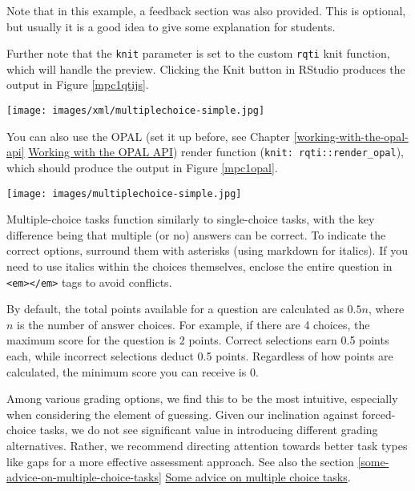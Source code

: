 \documentclass[twoside]{tufte-book}
\begin{document}
Note that in this example, a feedback section was also provided. This is optional, but usually it is a good idea to give some explanation for students.

Further note that the \texttt{knit} parameter is set to the custom \texttt{rqti} knit function, which will handle the preview. Clicking the Knit button in RStudio produces the output in Figure \ref{mpc1qtijs}.

\begin{figure*}
\centering
\texttt{[image: images/xml/multiplechoice-simple.jpg]}
\caption{\label{mpc1qtijs}Multiple choice task rendered in qtijs}
\end{figure*}

You can also use the OPAL (set it up before, see Chapter \ref{working-with-the-opal-api} \href{api_opal.html}{Working with the OPAL API}) render function (\texttt{knit:\ rqti::render\_opal}), which should produce the output in Figure \ref{mpc1opal}.

\begin{figure*}
\centering
\texttt{[image: images/multiplechoice-simple.jpg]}
\caption{\label{mpc1opal}Multiple choice task rendered in OPAL}
\end{figure*}

Multiple-choice tasks function similarly to single-choice tasks, with the key difference being that multiple (or no) answers can be correct. To indicate the correct options, surround them with asterisks (using markdown for italics). If you need to use italics within the choices themselves, enclose the entire question in \texttt{\textless{}em\textgreater{}\textless{}/em\textgreater{}} tags to avoid conflicts.

By default, the total points available for a question are calculated as \(0.5n\), where \(n\) is the number of answer choices. For example, if there are 4 choices, the maximum score for the question is 2 points. Correct selections earn 0.5 points each, while incorrect selections deduct 0.5 points. Regardless of how points are calculated, the minimum score you can receive is 0.

Among various grading options, we find this to be the most intuitive, especially when considering the element of guessing. Given our inclination against forced-choice tasks, we do not see significant value in introducing different grading alternatives. Rather, we recommend directing attention towards better task types like gaps for a more effective assessment approach. See also the section \ref{some-advice-on-multiple-choice-tasks} \hyperref[some-advice-on-multiple-choice-tasks]{Some advice on multiple choice tasks}.
\end{document}
